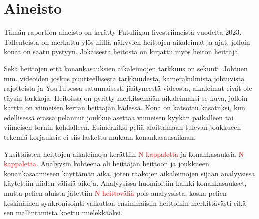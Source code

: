 \section{Aineisto}
    Tämän raportion aineisto on kerätty Futuliigan livestriimeistä vuodelta 2023.
    Tallenteista on merkattu ylös niillä näkyvien heittojen aikaleimat ja ajat, jolloin konat on saatu pystyyn.
    Jokaisesta heitosta on kirjattu myös heiton heittäjä.

    Sekä heittojen että konankasauksien aikaleimojen tarkkuus on sekunti.
    Johtuen mm. videoiden joskus puutteellisesta tarkkuudesta, kamerakulmista johtuvista rajotteista ja YouTubessa satunnaisesti jäätyneestä videosta, aikaleimat eivät ole täysin tarkkoja.
    Heitoissa on pyritty merkitsemään aikaleimaksi se kuva, jolloin karttu on viimeisen kerran heittäjän kädessä.
    Kona on katsottu kasatuksi, kun edellisessä erässä pelannut joukkue asettaa viimeisen kyykän paikalleen tai viimeisen tornin kohdalleen.
    Esimerkiksi peliä aloittamaan tulevan joukkueen tekemiä korjauksia ei siis laskettu mukaan konankasausaikaan.

    Yksittäisten heittojen aikaleimoja kerättiin \textcolor{red}{N kappaletta} ja konankasauksia \textcolor{red}{N kappaletta}.
    Analyysin kohteena oli heittäjän heittoon ja joukkueen konankasaamiseen käyttämän aika, joten raakojen aikaleimojen sijaan analyysissa käytettiin niiden välisiä aikoja.
    Analyysissa huomioitiin kaikki konankasaukset, mutta pelien aluista jätettiin \textcolor{red}{N heittoväliä} pois analyysista,
    koska pelien keskinäinen synkronisointi vaikuttaa ensimmäisiin heittoihin merkittävästi eikä sen mallintamista koettu mielekkääksi.